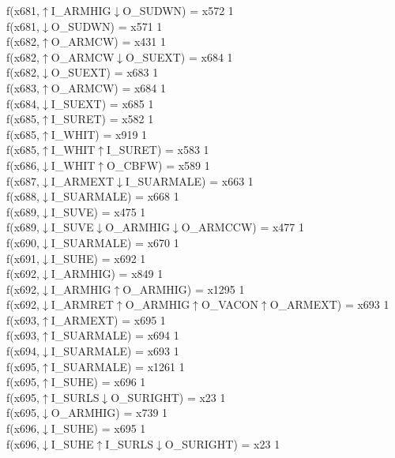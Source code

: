 f(x681,$\uparrow$I\_ARMHIG$\downarrow$O\_SUDWN) = x572 {1} \\
f(x681,$\downarrow$O\_SUDWN) = x571 {1} \\
f(x682,$\uparrow$O\_ARMCW) = x431 {1} \\
f(x682,$\uparrow$O\_ARMCW$\downarrow$O\_SUEXT) = x684 {1} \\
f(x682,$\downarrow$O\_SUEXT) = x683 {1} \\
f(x683,$\uparrow$O\_ARMCW) = x684 {1} \\
f(x684,$\downarrow$I\_SUEXT) = x685 {1} \\
f(x685,$\uparrow$I\_SURET) = x582 {1} \\
f(x685,$\uparrow$I\_WHIT) = x919 {1} \\
f(x685,$\uparrow$I\_WHIT$\uparrow$I\_SURET) = x583 {1} \\
f(x686,$\downarrow$I\_WHIT$\uparrow$O\_CBFW) = x589 {1} \\
f(x687,$\downarrow$I\_ARMEXT$\downarrow$I\_SUARMALE) = x663 {1} \\
f(x688,$\downarrow$I\_SUARMALE) = x668 {1} \\
f(x689,$\downarrow$I\_SUVE) = x475 {1} \\
f(x689,$\downarrow$I\_SUVE$\downarrow$O\_ARMHIG$\downarrow$O\_ARMCCW) = x477 {1} \\
f(x690,$\downarrow$I\_SUARMALE) = x670 {1} \\
f(x691,$\downarrow$I\_SUHE) = x692 {1} \\
f(x692,$\downarrow$I\_ARMHIG) = x849 {1} \\
f(x692,$\downarrow$I\_ARMHIG$\uparrow$O\_ARMHIG) = x1295 {1} \\
f(x692,$\downarrow$I\_ARMRET$\uparrow$O\_ARMHIG$\uparrow$O\_VACON$\uparrow$O\_ARMEXT) = x693 {1} \\
f(x693,$\uparrow$I\_ARMEXT) = x695 {1} \\
f(x693,$\uparrow$I\_SUARMALE) = x694 {1} \\
f(x694,$\downarrow$I\_SUARMALE) = x693 {1} \\
f(x695,$\uparrow$I\_SUARMALE) = x1261 {1} \\
f(x695,$\uparrow$I\_SUHE) = x696 {1} \\
f(x695,$\uparrow$I\_SURLS$\downarrow$O\_SURIGHT) = x23 {1} \\
f(x695,$\downarrow$O\_ARMHIG) = x739 {1} \\
f(x696,$\downarrow$I\_SUHE) = x695 {1} \\
f(x696,$\downarrow$I\_SUHE$\uparrow$I\_SURLS$\downarrow$O\_SURIGHT) = x23 {1} \\
